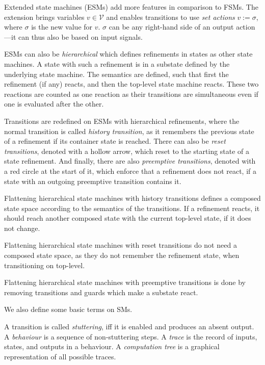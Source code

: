 \begin{definition}
    Extended state machines (ESMs) add more features in comparison to FSMs.
    The extension brings variables \(v \in \mathcal V\) and enables transitions to use \emph{set actions} \(v := \sigma\), where \(\sigma\) is the new value for \(v\).
    \(\sigma\) can be any right-hand side of an output action---it can thus also be based on input signals.

    ESMs can also be \emph{hierarchical} which defines refinements in states as other state machines.
    A state with such a refinement is in a substate defined by the underlying state machine.
    The semantics are defined, such that first the refinement (if any) reacts, and then the top-level state machine reacts.
    These two reactions are counted as one reaction as their transitions are simultaneous even if one is evaluated after the other.

    Transitions are redefined on ESMs with hierarchical refinements, where the normal transition is called \emph{history transition}, as it remembers the previous state of a refinement if its container state is reached.
    There can also be \emph{reset transitions}, denoted with a hollow arrow, which reset to the starting state of a state refinement.
    And finally, there are also \emph{preemptive transitions}, denoted with a red circle at the start of it, which enforce that a refinement does not react, if a state with an outgoing preemptive transition contains it.

    Flattening hierarchical state machines with history transitions defines a composed state space according to the semantics of the transitions.
    If a refinement reacts, it should reach another composed state with the current top-level state, if it does not change.

    Flattening hierarchical state machines with reset transitions do not need a composed state space, as they do not remember the refinement state, when transitioning on top-level.

    Flattening hierarchical state machines with preemptive transitions is done by removing transitions and guards which make a substate react.
\end{definition}

We also define some basic terms on SMs.

\begin{definition}
    A transition is called \emph{stuttering}, iff it is enabled and produces an absent output.
    A \emph{behaviour} is a sequence of non-stuttering steps.
    A \emph{trace} is the record of inputs, states, and outputs in a behaviour.
    A \emph{computation tree} is a graphical representation of all possible traces.
\end{definition}

